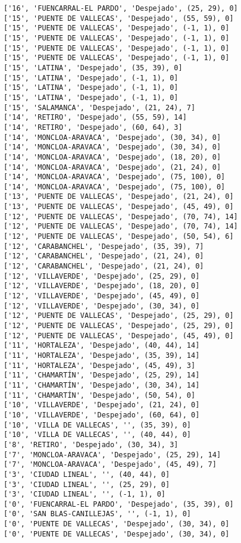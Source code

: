 \documentclass[11pt]{article}
\begin{document}
\begin{Verbatim}[commandchars=\\\{\}]
['16', 'FUENCARRAL-EL PARDO', 'Despejado', (25, 29), 0]
['15', 'PUENTE DE VALLECAS', 'Despejado', (55, 59), 0]
['15', 'PUENTE DE VALLECAS', 'Despejado', (-1, 1), 0]
['15', 'PUENTE DE VALLECAS', 'Despejado', (-1, 1), 0]
['15', 'PUENTE DE VALLECAS', 'Despejado', (-1, 1), 0]
['15', 'PUENTE DE VALLECAS', 'Despejado', (-1, 1), 0]
['15', 'LATINA', 'Despejado', (35, 39), 0]
['15', 'LATINA', 'Despejado', (-1, 1), 0]
['15', 'LATINA', 'Despejado', (-1, 1), 0]
['15', 'LATINA', 'Despejado', (-1, 1), 0]
['15', 'SALAMANCA', 'Despejado', (21, 24), 7]
['14', 'RETIRO', 'Despejado', (55, 59), 14]
['14', 'RETIRO', 'Despejado', (60, 64), 3]
['14', 'MONCLOA-ARAVACA', 'Despejado', (30, 34), 0]
['14', 'MONCLOA-ARAVACA', 'Despejado', (30, 34), 0]
['14', 'MONCLOA-ARAVACA', 'Despejado', (18, 20), 0]
['14', 'MONCLOA-ARAVACA', 'Despejado', (21, 24), 0]
['14', 'MONCLOA-ARAVACA', 'Despejado', (75, 100), 0]
['14', 'MONCLOA-ARAVACA', 'Despejado', (75, 100), 0]
['13', 'PUENTE DE VALLECAS', 'Despejado', (21, 24), 0]
['13', 'PUENTE DE VALLECAS', 'Despejado', (45, 49), 0]
['12', 'PUENTE DE VALLECAS', 'Despejado', (70, 74), 14]
['12', 'PUENTE DE VALLECAS', 'Despejado', (70, 74), 14]
['12', 'PUENTE DE VALLECAS', 'Despejado', (50, 54), 6]
['12', 'CARABANCHEL', 'Despejado', (35, 39), 7]
['12', 'CARABANCHEL', 'Despejado', (21, 24), 0]
['12', 'CARABANCHEL', 'Despejado', (21, 24), 0]
['12', 'VILLAVERDE', 'Despejado', (25, 29), 0]
['12', 'VILLAVERDE', 'Despejado', (18, 20), 0]
['12', 'VILLAVERDE', 'Despejado', (45, 49), 0]
['12', 'VILLAVERDE', 'Despejado', (30, 34), 0]
['12', 'PUENTE DE VALLECAS', 'Despejado', (25, 29), 0]
['12', 'PUENTE DE VALLECAS', 'Despejado', (25, 29), 0]
['12', 'PUENTE DE VALLECAS', 'Despejado', (45, 49), 0]
['11', 'HORTALEZA', 'Despejado', (40, 44), 14]
['11', 'HORTALEZA', 'Despejado', (35, 39), 14]
['11', 'HORTALEZA', 'Despejado', (45, 49), 3]
['11', 'CHAMARTÍN', 'Despejado', (25, 29), 14]
['11', 'CHAMARTÍN', 'Despejado', (30, 34), 14]
['11', 'CHAMARTÍN', 'Despejado', (50, 54), 0]
['10', 'VILLAVERDE', 'Despejado', (21, 24), 0]
['10', 'VILLAVERDE', 'Despejado', (60, 64), 0]
['10', 'VILLA DE VALLECAS', '', (35, 39), 0]
['10', 'VILLA DE VALLECAS', '', (40, 44), 0]
['8', 'RETIRO', 'Despejado', (30, 34), 3]
['7', 'MONCLOA-ARAVACA', 'Despejado', (25, 29), 14]
['7', 'MONCLOA-ARAVACA', 'Despejado', (45, 49), 7]
['3', 'CIUDAD LINEAL', '', (40, 44), 0]
['3', 'CIUDAD LINEAL', '', (25, 29), 0]
['3', 'CIUDAD LINEAL', '', (-1, 1), 0]
['0', 'FUENCARRAL-EL PARDO', 'Despejado', (35, 39), 0]
['0', 'SAN BLAS-CANILLEJAS', '', (-1, 1), 0]
['0', 'PUENTE DE VALLECAS', 'Despejado', (30, 34), 0]
['0', 'PUENTE DE VALLECAS', 'Despejado', (30, 34), 0]

\end{Verbatim}
\end{document}
